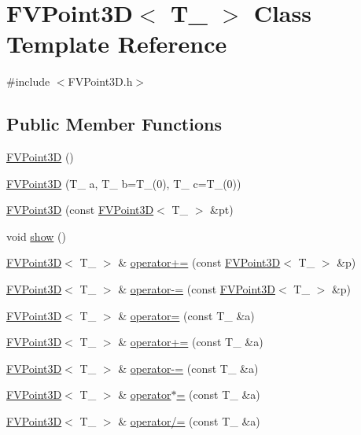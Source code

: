 \hypertarget{classFVPoint3D}{
\section{FVPoint3D$<$ T\_\- $>$ Class Template Reference}
\label{dd/d3c/classFVPoint3D}
}


{\ttfamily \#include $<$FVPoint3D.h$>$}

\subsection*{Public Member Functions}
\begin{DoxyCompactItemize}
\item 
\hyperlink{classFVPoint3D_a9dd5c9669c6e933256675d47994700ac}{FVPoint3D} ()
\item 
\hyperlink{classFVPoint3D_a40dc20a2dcc3cabfa4345c93a27d966f}{FVPoint3D} (T\_\- a, T\_\- b=T\_\-(0), T\_\- c=T\_\-(0))
\item 
\hyperlink{classFVPoint3D_ab5f9d102958dbc987d7d3994aa5f16e4}{FVPoint3D} (const \hyperlink{classFVPoint3D}{FVPoint3D}$<$ T\_\- $>$ \&pt)
\item 
void \hyperlink{classFVPoint3D_a4b148f40a95444d5669406b918ad2f52}{show} ()
\item 
\hyperlink{classFVPoint3D}{FVPoint3D}$<$ T\_\- $>$ \& \hyperlink{classFVPoint3D_aab237c98f20333e6e5e3b0455c4615f4}{operator+=} (const \hyperlink{classFVPoint3D}{FVPoint3D}$<$ T\_\- $>$ \&p)
\item 
\hyperlink{classFVPoint3D}{FVPoint3D}$<$ T\_\- $>$ \& \hyperlink{classFVPoint3D_a9f093ca96f287c2ff3349a608c7c677e}{operator-\/=} (const \hyperlink{classFVPoint3D}{FVPoint3D}$<$ T\_\- $>$ \&p)
\item 
\hyperlink{classFVPoint3D}{FVPoint3D}$<$ T\_\- $>$ \& \hyperlink{classFVPoint3D_ab8df0379a9432696924777345b8b81b6}{operator=} (const T\_\- \&a)
\item 
\hyperlink{classFVPoint3D}{FVPoint3D}$<$ T\_\- $>$ \& \hyperlink{classFVPoint3D_a36e9ed0e9388c2fbb3a98cf26b6d70c5}{operator+=} (const T\_\- \&a)
\item 
\hyperlink{classFVPoint3D}{FVPoint3D}$<$ T\_\- $>$ \& \hyperlink{classFVPoint3D_a0c84ddf5fbd10ebcf64d2d419b9678ea}{operator-\/=} (const T\_\- \&a)
\item 
\hyperlink{classFVPoint3D}{FVPoint3D}$<$ T\_\- $>$ \& \hyperlink{classFVPoint3D_a0f888c86bfd848cff80fe5c0f1ee8dbb}{operator$\ast$=} (const T\_\- \&a)
\item 
\hyperlink{classFVPoint3D}{FVPoint3D}$<$ T\_\- $>$ \& \hyperlink{classFVPoint3D_a55ff1f2b865b41002ff850e648fa186d}{operator/=} (const T\_\- \&a)
\end{DoxyCompactItemize}
